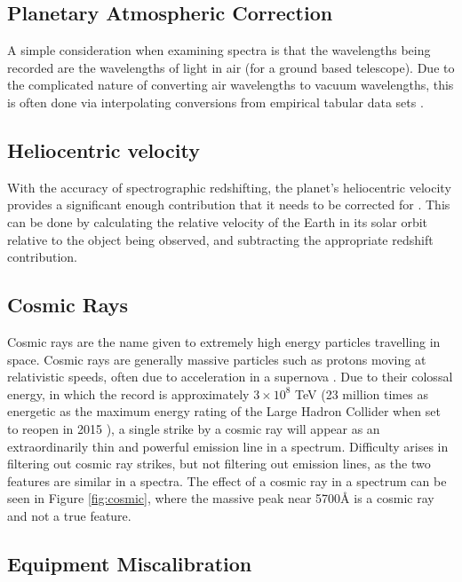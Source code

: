 \documentclass[titlesmallcaps, examinerscopy, copyrightpage]{uqthesis}
\begin{document}
\subsection{Planetary Atmospheric Correction}

A simple consideration when examining spectra is that the wavelengths being recorded are the wavelengths of light in air (for a ground based telescope). Due to the complicated nature of converting air wavelengths to vacuum wavelengths, this is often done via interpolating conversions from empirical tabular data sets \cite{morton1991atomic}.

\subsection{Heliocentric velocity}

With the accuracy of spectrographic redshifting, the planet's heliocentric velocity provides a significant enough contribution that it needs to be corrected for \cite{colless20012df,baldry2014galaxy}. This can be done by calculating the relative velocity of the Earth in its solar orbit relative to the object being observed, and subtracting the appropriate redshift contribution.

\subsection{Cosmic Rays}

Cosmic rays are the name given to extremely high energy particles travelling in space. Cosmic rays are generally massive particles such as protons moving at relativistic speeds, often due to acceleration in a supernova \cite{ackermann2013detection}. Due to their colossal energy, in which the record is approximately $3\times10^{8}$ TeV (23 million times as energetic as the maximum energy rating of the Large Hadron Collider when set to reopen in 2015 \cite{lhc}), a single strike by a cosmic ray will appear as an extraordinarily thin and powerful emission line in a spectrum. Difficulty arises in filtering out cosmic ray strikes, but not filtering out emission lines, as the two features are similar in a spectra. The effect of a cosmic ray in a spectrum can be seen in Figure \ref{fig:cosmic}, where the massive peak near 5700{\AA} is a cosmic ray and not a true feature.


\subsection{Equipment Miscalibration}
\end{document}
